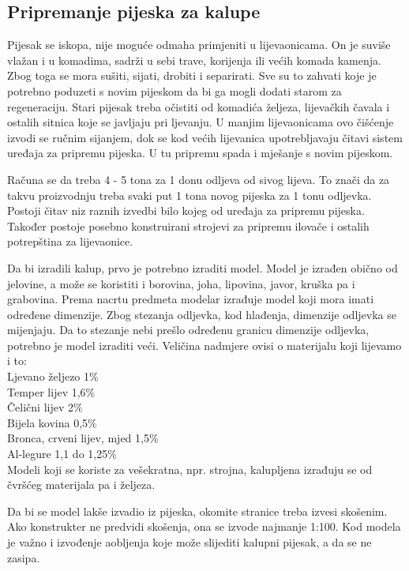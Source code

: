 \documentclass[a4paper,12pt]{article}
\numberwithin{figure}{section}
\begin{document}
\subsection{Pripremanje pijeska za kalupe}
Pijesak se iskopa, nije moguće odmaha primjeniti u lijevaonicama. On je suviše vlažan i u komadima, sadrži u sebi trave, korijenja ili većih komada kamenja. Zbog toga se mora sušiti, sijati, drobiti i separirati. Sve su to zahvati koje je potrebno poduzeti s novim pijeskom da bi ga mogli dodati starom za regeneraciju. Stari pijesak treba očistiti od komadića željeza, lijevačkih čavala i ostalih sitnica koje se javljaju pri ljevanju. U manjim lijevaonicama ovo čišćenje izvodi se ručnim sijanjem, dok se kod većih lijevanica upotrebljavaju čitavi sistem uređaja za pripremu pijeska. U tu pripremu spada i mješanje s novim pijeskom.\par
Računa se da treba 4 - 5 tona za 1 donu odljeva od sivog lijeva. To znači da za takvu proizvodnju treba svaki put 1 tona novog pijeska za 1 tonu odljevka.
Postoji čitav niz raznih izvedbi bilo kojeg od uređaja za pripremu pijeska. Također postoje posebno konstruirani strojevi za pripremu ilovače i ostalih potrepština za lijevaonice. \par
Da bi izradili kalup, prvo je potrebno izraditi model. Model je izrađen obično od jelovine, a može se koristiti i borovina, joha, lipovina, javor, kruška pa i grabovina. Prema nacrtu predmeta modelar izrađuje model koji mora imati određene dimenzije. Zbog stezanja odljevka, kod hlađenja, dimenzije odljevka se mijenjaju. Da to stezanje nebi prešlo određenu granicu dimenzije odljevka, potrebno je model izraditi veći. Veličina nadmjere ovisi o materijalu koji lijevamo i to:\\
Ljevano željezo 1$\%$\\
Temper lijev 1,6$\%$\\
Čelični lijev 2$\%$\\
Bijela kovina 0,5$\%$\\
Bronca, crveni lijev, mjed 1,5$\%$\\
Al-legure 1,1 do 1,25$\%$\\
Modeli koji se koriste za vešekratna, npr. strojna, kalupljena izrađuju se od čvršćeg materijala pa i željeza. \par
Da bi se model lakše izvadio iz pijeska, okomite stranice treba izvesi skošenim. Ako konstrukter ne predvidi skošenja, ona se izvode najmanje 1:100. Kod modela je važno i izvođenje aobljenja koje može slijediti kalupni pijesak, a da se ne zasipa.\par
\end{document}

